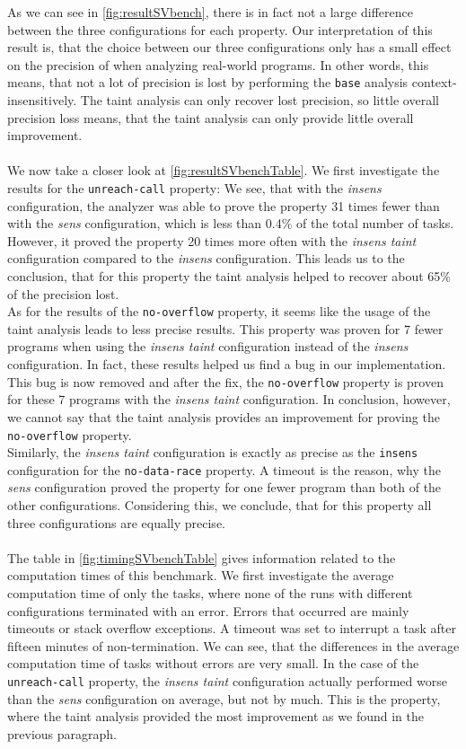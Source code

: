       As we can see in \autoref{fig:resultSVbench}, there is in fact not a large difference between the three configurations for each property. Our interpretation of this result is, that the choice between our three configurations only has a small effect on the precision of \gob when analyzing real-world programs. In other words, this means, that not a lot of precision is lost by performing the \texttt{base} analysis context-insensitively. The taint analysis can only recover lost precision, so little overall precision loss means, that the taint analysis can only provide little overall improvement.\\
      \\
      We now take a closer look at \autoref{fig:resultSVbenchTable}. We first investigate the results for the \texttt{unreach-call} property: We see, that with the \textit{insens} configuration, the analyzer was able to prove the property 31 times fewer than with the \textit{sens} configuration, which is less than 0.4\% of the total number of tasks. However, it proved the property 20 times more often with the \textit{insens taint} configuration compared to the \textit{insens} configuration. This leads us to the conclusion, that for this property the taint analysis helped to recover about 65\% of the precision lost.\\
      As for the results of the \texttt{no-overflow} property, it seems like the usage of the taint analysis leads to less precise results. This property was proven for 7 fewer programs when using the \textit{insens taint} configuration instead of the \textit{insens} configuration. In fact, these results helped us find a bug in our implementation. This bug is now removed and after the fix, the \texttt{no-overflow} property is proven for these 7 programs with the \textit{insens taint} configuration. In conclusion, however, we cannot say that the taint analysis provides an improvement for proving the \texttt{no-overflow} property.\\
      Similarly, the \textit{insens taint} configuration is exactly as precise as the \texttt{insens} configuration for the \texttt{no-data-race} property. A timeout is the reason, why the \textit{sens} configuration proved the property for one fewer program than both of the other configurations. Considering this, we conclude, that for this property all three configurations are equally precise.\\
      \\
      The table in \autoref{fig:timingSVbenchTable} gives information related to the computation times of this benchmark. We first investigate the average computation time of only the tasks, where none of the runs with different configurations terminated with an error. Errors that occurred are mainly timeouts or stack overflow exceptions. A timeout was set to interrupt a task after fifteen minutes of non-termination. We can see, that the differences in the average computation time of tasks without errors are very small. In the case of the \texttt{unreach-call} property, the \textit{insens taint} configuration actually performed worse than the \textit{sens} configuration on average, but not by much. This is the property, where the taint analysis provided the most improvement as we found in the previous paragraph.\\
